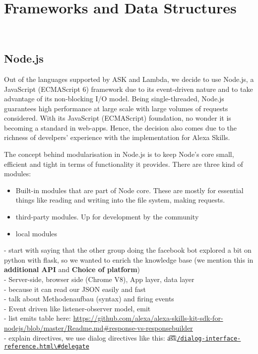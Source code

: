 \section{Frameworks and Data Structures}~\label{frameworks_structs}



\subsection*{Node.js}
\label{nodejs:def}
Out of the languages supported by ASK and Lambda, we decide to use Node.js, a JavaScript (ECMAScript 6) framework due to its event-driven nature and to take advantage of its non-blocking I/O model. Being single-threaded, Node.js guarantees high performance at large scale with large volumes of requests considered. With its JavaScript (ECMAScript) foundation, no wonder it is becoming a standard in web-apps. Hence, the decision also comes due to the richness of develpers' experience with the implementation for Alexa Skills.

The concept behind modularisation in Node.js is to keep Node's core small, efficient and tight in terms of functionality it provides. There are three kind of modules:

\begin{itemize}
\item Built-in modules that are part of Node core. These are mostly for essential things like reading and writing into the file system, making requests.

\item third-party modules. Up for development by the community

\item local modules

\end{itemize}



	- start with saying that the other group doing the facebook bot explored a bit on python with flask, so we wanted to enrich the knowledge base (we mention this in \textbf{additional API }and \textbf{Choice of platform})\\
	- Server-side, browser side (Chrome V8), App layer, data layer\\
	- because it can read our JSON easily and fast\\
	- talk about Methodenaufbau (syntax) and firing events\\
	- Event driven like listener-observer model, emit\\
	- list emits table here: \url{https://github.com/alexa/alexa-skills-kit-sdk-for-nodejs/blob/master/Readme.md#response-vs-responsebuilder}\\
	- explain directives, we use dialog directives like this: \t{a\t{sk}}\href{https://developer.amazon.com/docs/custom-skills/dialog-interface-reference.html\#delegate}{\lstinline|/dialog-interface-reference.html\#delegate|}	


